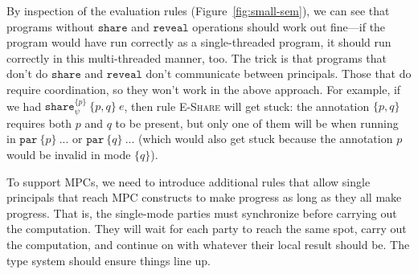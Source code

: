 \documentclass[10pt]{article}
\newcommand{\rulelab}[1]{{\small \textsc{#1}}}
\newcommand{\kw}[1]{\ensuremath{\mathtt{#1}}}
\newcommand{\epar}[2]{\ensuremath{\kw{par}~{#1}~{#2}}}
\newcommand{\eshare}[4]{\ensuremath{\kw{share}^{#2}_{#1}~{#3}~{#4}}}
\begin{document}
By inspection of the evaluation rules (Figure~\ref{fig:small-sem}), we can
see that programs without $\kw{share}$ and $\kw{reveal}$ operations
should work out fine---if the program would have run correctly as a
single-threaded program, it should run correctly in this
multi-threaded manner, too. The trick is that programs that don't do
$\kw{share}$ and $\kw{reveal}$ don't communicate between
principals. Those that do require coordination, so they won't work in
the above approach. For example, if we had
$\eshare{\psi}{\{p\}}{\{p,q\}}{e}$, then rule \rulelab{E-Share} will
get stuck: the annotation $\{p,q\}$ requires both $p$ and $q$ to be
present, but only one of them will be when running in
$\epar{\{p\}}{...}$ or $\epar{\{q\}}{...}$ (which would also get stuck
because the annotation $p$ would be invalid in mode $\{q\}$).

To support MPCs, we need to introduce additional rules that allow
single principals that reach MPC constructs to make progress as long
as they all make progress. That is, the single-mode parties must
synchronize before carrying out the computation. They will wait for
each party to reach the same spot, carry out the computation, and
continue on with whatever their local result should be. The type
system should ensure things line up.
\end{document}
